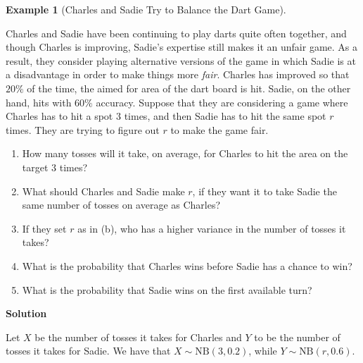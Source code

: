\documentclass[
  letterpaper,
  DIV=11,
  numbers=noendperiod]{scrreprt}
\providecommand{\tightlist}{%
  \setlength{\itemsep}{0pt}\setlength{\parskip}{0pt}}\usepackage{longtable,booktabs,array}
\theoremstyle{definition}
\theoremstyle{definition}
\newtheorem{example}{Example}[chapter]
\theoremstyle{definition}
\theoremstyle{remark}
\begin{document}
\begin{example}[Charles and Sadie Try to Balance the Dart
Game]\protect\hypertarget{exm-negative-binomial}{}\label{exm-negative-binomial}

Charles and Sadie have been continuing to play darts quite often
together, and though Charles is improving, Sadie's expertise still makes
it an unfair game. As a result, they consider playing alternative
versions of the game in which Sadie is at a disadvantage in order to
make things more \emph{fair}. Charles has improved so that \(20\%\) of
the time, the aimed for area of the dart board is hit. Sadie, on the
other hand, hits with \(60\%\) accuracy. Suppose that they are
considering a game where Charles has to hit a spot \(3\) times, and then
Sadie has to hit the same spot \(r\) times. They are trying to figure
out \(r\) to make the game fair.

\begin{enumerate}
\def\labelenumi{\alph{enumi}.}
\tightlist
\item
  How many tosses will it take, on average, for Charles to hit the area
  on the target \(3\) times?
\item
  What should Charles and Sadie make \(r\), if they want it to take
  Sadie the same number of tosses on average as Charles?
\item
  If they set \(r\) as in (b), who has a higher variance in the number
  of tosses it takes?
\item
  What is the probability that Charles wins before Sadie has a chance to
  win?
\item
  What is the probability that Sadie wins on the first available turn?
\end{enumerate}

\begin{tcolorbox}[enhanced jigsaw, colback=white, colframe=quarto-callout-color-frame, arc=.35mm, leftrule=.75mm, rightrule=.15mm, opacityback=0, breakable, bottomrule=.15mm, left=2mm, toprule=.15mm]

\vspace{-3mm}\textbf{Solution}\vspace{3mm}

Let \(X\) be the number of tosses it takes for Charles and \(Y\) to be
the number of tosses it takes for Sadie. We have that
\(X \sim \text{NB}(3, 0.2)\), while \(Y\sim\text{NB}(r, 0.6)\).


\end{tcolorbox}
\end{example}
\end{document}
